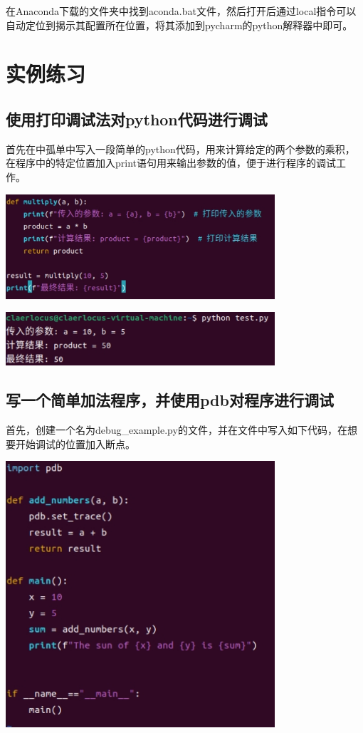 \documentclass[UTF8,a4paper]{ctexart}
\begin{document}
\begin{sloppypar}
	在Anaconda下载的文件夹中找到aconda.bat文件，然后打开后通过local指令可以自动定位到揭示其配置所在位置，将其添加到pycharm的python解释器中即可。
	
	\section{实例练习}
	\subsection{使用打印调试法对python代码进行调试}
	首先在中孤单中写入一段简单的python代码，用来计算给定的两个参数的乘积，在程序中的特定位置加入print语句用来输出参数的值，便于进行程序的调试工作。

	\includegraphics[width = 10cm]{13}
	
	\includegraphics[width = 10cm]{14}
	
	\subsection{写一个简单加法程序，并使用pdb对程序进行调试}
	首先，创建一个名为debug\_example.py的文件，并在文件中写入如下代码，在想要开始调试的位置加入断点。

	\includegraphics[width = 10cm]{15}
	

\end{sloppypar}
\end{document}
